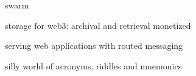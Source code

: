 \begin{frame}{swarm}
\begin{block}{}
storage for web3: archival and retrieval monetized
\end{block}
\begin{block}{}
serving web applications with routed messaging
\end{block}
\begin{block}{}
silly world of acronyms, riddles and mnemonics
\end{block}
\end{frame}





%
